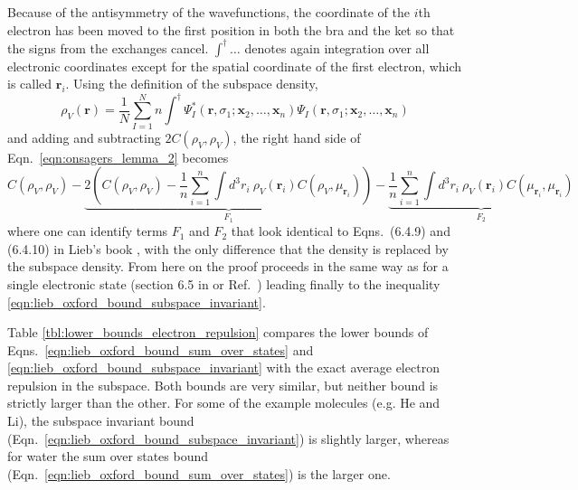 \documentclass[journal=jacsat,manuscript=article]{achemso}
\renewcommand\vec[1]{\mathbf{#1}}
\begin{document}
Because of the antisymmetry of the wavefunctions, the coordinate of the $i$th electron has been moved to the first position in both the bra
and the ket so that the signs from the exchanges cancel. $\int^{\dagger}\ldots$ denotes again integration over all electronic coordinates except
for the spatial coordinate of the first electron, which is called $\vec{r}_i$. 
Using the definition of the subspace density,
\begin{equation}
 \rho_V(\vec{r}) = \frac{1}{N} \sum_{I=1}^{N} n \int^{\dagger}
 \Psi_I^*(\vec{r},\sigma_1;\vec{x}_2,\ldots,\vec{x}_n) \Psi_I(\vec{r},\sigma_1;\vec{x}_2,\ldots,\vec{x}_n)
\end{equation}
and adding and subtracting $2 C(\rho_V,\rho_V)$, the right hand side of Eqn.~\ref{eqn:onsagers_lemma_2}
becomes
\begin{equation}
 C(\rho_V,\rho_V) 
  - \underbrace{2 \left( 
    C(\rho_V,\rho_V) - \frac{1}{n} \sum_{i=1}^{n} \int d^3r_i ~ \rho_V(\vec{r}_i) C(\rho_V,\mu_{\vec{r}_i})
    \right)}_{F_1}
  - \underbrace{\frac{1}{n} \sum_{i=1}^{n} \int d^3r_i ~ \rho_V(\vec{r}_i) C(\mu_{\vec{r}_i},\mu_{\vec{r}_i})}_{F_2}
\end{equation}
where one can identify terms $F_1$ and $F_2$ that look identical to
Eqns.~(6.4.9) and (6.4.10) in Lieb's book \cite{Lieb2010_Stability_of_Matter},
with the only difference that the density is replaced by the subspace density.
From here on the proof proceeds in the same way as for a single electronic state (section 6.5 in \cite{Lieb2010_Stability_of_Matter}
or Ref.~\cite{Lieb1981}) leading finally to the inequality \ref{eqn:lieb_oxford_bound_subspace_invariant}.

Table \ref{tbl:lower_bounds_electron_repulsion} compares the lower bounds of Eqns.~\ref{eqn:lieb_oxford_bound_sum_over_states} and
\ref{eqn:lieb_oxford_bound_subspace_invariant} with the exact average electron repulsion in the subspace. Both bounds are very similar,
but neither bound is strictly larger than the other. For some of the example molecules (e.g. He and Li), the subspace invariant
bound (Eqn.~\ref{eqn:lieb_oxford_bound_subspace_invariant}) is slightly larger,
whereas for water the sum over states bound (Eqn.~\ref{eqn:lieb_oxford_bound_sum_over_states}) is the larger one.



\end{document}
